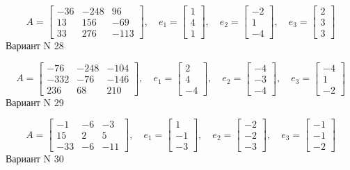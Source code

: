 \documentclass[11pt]{report}
\begin{document}
$$A = \left[\begin{matrix}-36 & -248 & 96\\13 & 156 & -69\\33 & 276 & -113\end{matrix}\right],\quad e_1 = \left[\begin{matrix}1\\4\\1\end{matrix}\right],\quad e_2 = \left[\begin{matrix}-2\\1\\-4\end{matrix}\right],\quad e_3 = \left[\begin{matrix}2\\3\\3\end{matrix}\right]$$Вариант N 28

$$A = \left[\begin{matrix}-76 & -248 & -104\\-332 & -76 & -146\\236 & 68 & 210\end{matrix}\right],\quad e_1 = \left[\begin{matrix}2\\4\\-4\end{matrix}\right],\quad e_2 = \left[\begin{matrix}-4\\-3\\-4\end{matrix}\right],\quad e_3 = \left[\begin{matrix}-4\\1\\-2\end{matrix}\right]$$Вариант N 29

$$A = \left[\begin{matrix}-1 & -6 & -3\\15 & 2 & 5\\-33 & -6 & -11\end{matrix}\right],\quad e_1 = \left[\begin{matrix}1\\-1\\-3\end{matrix}\right],\quad e_2 = \left[\begin{matrix}-2\\-2\\-3\end{matrix}\right],\quad e_3 = \left[\begin{matrix}-1\\-1\\-2\end{matrix}\right]$$Вариант N 30
\end{document}
